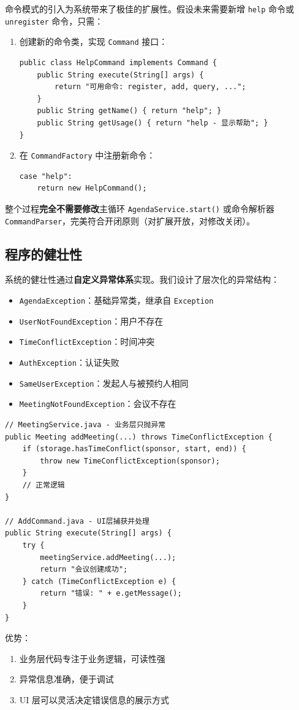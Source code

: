 \documentclass[a4paper]{article}
\begin{document}
命令模式的引入为系统带来了极佳的扩展性。假设未来需要新增 \texttt{help} 命令或 \texttt{unregister} 命令，只需：

\begin{enumerate}
    \item 创建新的命令类，实现 \texttt{Command} 接口：
\begin{lstlisting}
public class HelpCommand implements Command {
    public String execute(String[] args) {
        return "可用命令: register, add, query, ...";
    }
    public String getName() { return "help"; }
    public String getUsage() { return "help - 显示帮助"; }
}
\end{lstlisting}

    \item 在 \texttt{CommandFactory} 中注册新命令：
\begin{lstlisting}
case "help":
    return new HelpCommand();
\end{lstlisting}
\end{enumerate}

整个过程\textbf{完全不需要修改}主循环 \texttt{AgendaService.start()} 或命令解析器 \texttt{CommandParser}，完美符合开闭原则（对扩展开放，对修改关闭）。

\subsection{程序的健壮性}

系统的健壮性通过\textbf{自定义异常体系}实现。我们设计了层次化的异常结构：

\begin{itemize}
    \item \texttt{AgendaException}：基础异常类，继承自 \texttt{Exception}
    \item \texttt{UserNotFoundException}：用户不存在
    \item \texttt{TimeConflictException}：时间冲突
    \item \texttt{AuthException}：认证失败
    \item \texttt{SameUserException}：发起人与被预约人相同
    \item \texttt{MeetingNotFoundException}：会议不存在
\end{itemize}

\begin{lstlisting}
// MeetingService.java - 业务层只抛异常
public Meeting addMeeting(...) throws TimeConflictException {
    if (storage.hasTimeConflict(sponsor, start, end)) {
        throw new TimeConflictException(sponsor);
    }
    // 正常逻辑
}

// AddCommand.java - UI层捕获并处理
public String execute(String[] args) {
    try {
        meetingService.addMeeting(...);
        return "会议创建成功";
    } catch (TimeConflictException e) {
        return "错误: " + e.getMessage();
    }
}
\end{lstlisting}
优势：
\begin{enumerate}
    \item 业务层代码专注于业务逻辑，可读性强
    \item 异常信息准确，便于调试
    \item UI 层可以灵活决定错误信息的展示方式
\end{enumerate}
\end{document}
